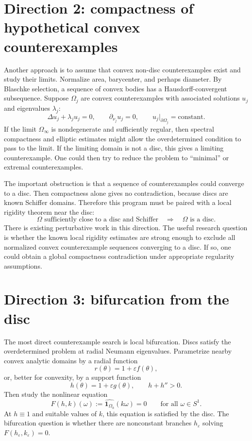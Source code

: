 \documentclass[11pt]{article}
\newcommand{\Om}{\Omega}
\newcommand{\eps}{\varepsilon}
\newcommand{\1}{\mathbf 1}
\begin{document}
\section*{Direction 2: compactness of hypothetical convex counterexamples}

Another approach is to assume that convex non-disc counterexamples exist and
study their limits. Normalize area, barycenter, and perhaps diameter. By
Blaschke selection, a sequence of convex bodies has a Hausdorff-convergent
subsequence. Suppose $\Om_j$ are convex counterexamples with associated
solutions $u_j$ and eigenvalues $\lambda_j$:
\[
    \Delta u_j+\lambda_j u_j=0,\qquad
    \partial_{\nu_j}u_j=0,\qquad
    u_j|_{\partial\Om_j}=\text{constant}.
\]
If the limit $\Om_\infty$ is nondegenerate and sufficiently regular, then
spectral compactness and elliptic estimates might allow the overdetermined
condition to pass to the limit. If the limiting domain is not a disc, this gives
a limiting counterexample. One could then try to reduce the problem to
``minimal'' or extremal counterexamples.

The important obstruction is that a sequence of counterexamples could converge
to a disc. Then compactness alone gives no contradiction, because discs are
known Schiffer domains. Therefore this program must be paired with a local
rigidity theorem near the disc:
\[
    \Om \text{ sufficiently close to a disc and Schiffer}
    \quad \Longrightarrow \quad
    \Om \text{ is a disc}.
\]
There is existing perturbative work in this direction. The useful research
question is whether the known local rigidity estimates are strong enough to
exclude all normalized convex counterexample sequences converging to a disc.
If so, one could obtain a global compactness contradiction under appropriate
regularity assumptions.

\section*{Direction 3: bifurcation from the disc}

The most direct counterexample search is local bifurcation. Discs satisfy the
overdetermined problem at radial Neumann eigenvalues. Parametrize nearby convex
analytic domains by a radial function
\[
    r(\theta)=1+\eps f(\theta),
\]
or, better for convexity, by a support function
\[
    h(\theta)=1+\eps g(\theta),\qquad h+h''>0.
\]
Then study the nonlinear equation
\[
    F(h,k)(\omega):=\widehat{\1_{\Om_h}}(k\omega)=0
    \qquad \text{for all }\omega\in S^1.
\]
At $h\equiv1$ and suitable values of $k$, this equation is satisfied by the
disc. The bifurcation question is whether there are nonconstant branches
$h_\eps$ solving $F(h_\eps,k_\eps)=0$.
\end{document}
